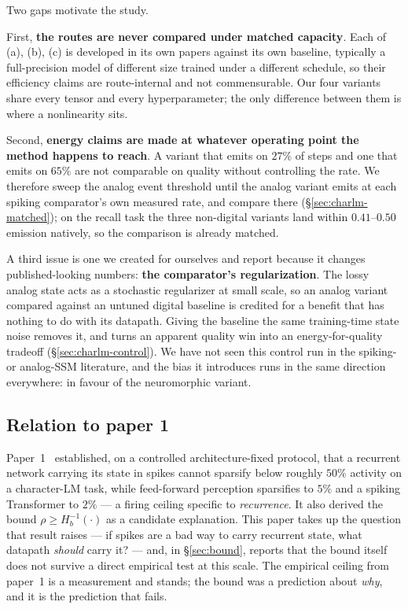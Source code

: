 Two gaps motivate the study.

First, \textbf{the routes are never compared under matched capacity}. Each of (a), (b), (c) is
developed in its own papers against its own baseline, typically a full-precision model of
different size trained under a different schedule, so their efficiency claims are
route-internal and not commensurable. Our four variants share every tensor and every
hyperparameter; the only difference between them is where a nonlinearity sits.

Second, \textbf{energy claims are made at whatever operating point the method happens to reach}.
A variant that emits on $27\%$ of steps and one that emits on $65\%$ are not comparable on quality
without controlling the rate. We therefore sweep the analog event threshold until the analog
variant emits at each spiking comparator's own measured rate, and compare there
(\S\ref{sec:charlm-matched}); on the recall task the three non-digital variants land within
$0.41$--$0.50$ emission natively, so the comparison is already matched.

A third issue is one we created for ourselves and report because it changes published-looking
numbers: \textbf{the comparator's regularization}. The lossy analog state acts as a stochastic
regularizer at small scale, so an analog variant compared against an untuned digital baseline is
credited for a benefit that has nothing to do with its datapath. Giving the baseline the same
training-time state noise removes it, and turns an apparent quality win into an energy-for-quality
tradeoff (\S\ref{sec:charlm-control}). We have not seen this control run in the spiking- or
analog-SSM literature, and the bias it introduces runs in the same direction everywhere: in favour
of the neuromorphic variant.

\subsection{Relation to paper 1}

Paper~1~\citep{paper1} established, on a controlled architecture-fixed protocol, that a recurrent
network carrying its state in spikes cannot sparsify below roughly $50\%$ activity on a
character-LM task, while feed-forward perception sparsifies to $5\%$ and a spiking Transformer to
$2\%$ --- a firing ceiling specific to \emph{recurrence}. It also derived the bound
$\rho \geq H_b^{-1}(\cdot)$ as a candidate explanation. This paper takes up the question that
result raises --- if spikes are a bad way to carry recurrent state, what datapath \emph{should}
carry it? --- and, in \S\ref{sec:bound}, reports that the bound itself does not survive a direct
empirical test at this scale. The empirical ceiling from paper~1 is a measurement and stands; the
bound was a prediction about \emph{why}, and it is the prediction that fails.
